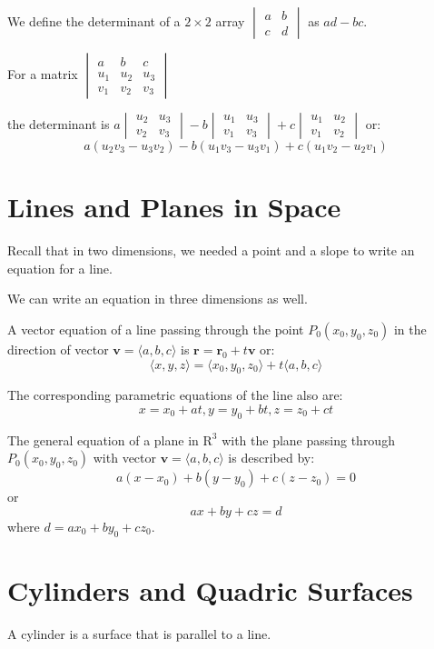 \documentclass[../calc3.tex]{subfiles}
\begin{document}
We define the determinant of a $2\times 2$ array
$\begin{vmatrix}
a & b\\
c & d   
\end{vmatrix}$
as $ad-bc$.

For a matrix $\begin{vmatrix}
a & b & c\\
u_1 & u_2 & u_3\\
v_1 & v_2 & v_3
\end{vmatrix}$

the determinant is $a\begin{vmatrix}
    u_2 & u_3\\
    v_2 & v_3
\end{vmatrix}-b\begin{vmatrix}
    u_1 & u_3\\
    v_1 & v_3
\end{vmatrix}
+c\begin{vmatrix}
    u_1 & u_2\\
    v_1 & v_2
\end{vmatrix}$ 
or:
\[a(u_2v_3-u_3v_2)-b(u_1v_3-u_3v_1)+c(u_1v_2-u_2v_1)\]

\section{Lines and Planes in Space}
Recall that in two dimensions, we needed a point and a slope to write an equation for a line.

We can write an equation in three dimensions as well.

A vector equation of a line passing through the point $P_0(x_0,y_0,z_0)$ in the direction of vector 
$\textbf{v}=\langle a,b,c \rangle$ is $\textbf{r}=\textbf{r}_0+t\textbf{v}$ or:
\[\langle x,y,z \rangle = \langle x_0,y_0,z_0 \rangle + t\langle a,b,c \rangle\]

The corresponding parametric equations of the line also are:
\[x=x_0+at, y=y_0+bt, z=z_0+ct\]

The general equation of a plane in $\mathrm{R}^3$ with the plane passing through 
$P_0(x_0,y_0,z_0)$ with vector $\textbf{v}=\langle a,b,c\rangle$ is described by:
\[a(x-x_0)+b(y-y_0)+c(z-z_0)=0\]
or 
\[ax+by+cz=d\] where $d=ax_0+by_0+cz_0$.

\section{Cylinders and Quadric Surfaces}
A cylinder is a surface that is parallel to a line.
\end{document}
